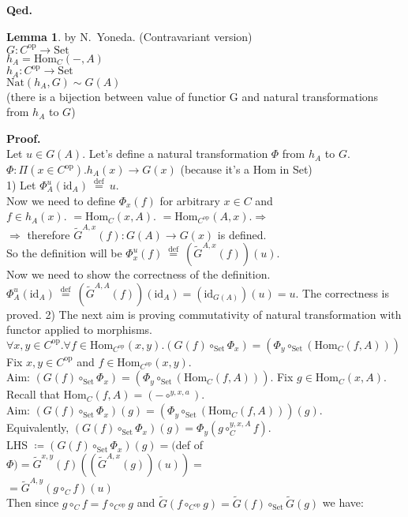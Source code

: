 \documentclass[10pt,a4paper]{article}
\theoremstyle{definition}
\newtheorem{lemma}{Lemma}[section]
\newcommand{\Hom}{{\textrm{Hom}}}
\newcommand{\Nat}{{\textrm{Nat}}}
\newcommand{\GMor}{{\widetilde{G}\textrm{}}}
\newcommand{\op}{{\textrm{op}}}
\newcommand{\id}{{\textrm{id}}}
\newcommand{\defi}{{\textrm{def}}}
\newcommand{\eqdef}{{\ \stackrel{\defi}{=}\ }}
\newcommand{\Set}{{\textrm{Set}}}
\newcommand{\myprf}{\noindent\textbf{Proof.}}
\newcommand{\myqed}{\noindent\textbf{Qed.}}
\begin{document}
\myqed
\begin{lemma}{by N.~Yoneda. (Contravariant version)}\\
$G : C^\op \to \Set$\\
$h_A = \Hom_C(-,A)$\\
$h_A : C^\op \to \Set$\\
$\Nat(h_A,G)\sim G(A)$\\
(there is a bijection between value of functior G and natural transformations from $h_A$ to $G$)
\end{lemma}
\myprf\\
Let $u\in G(A)$. Let's define a natural transformation $\Phi$ from $h_A$ to $G$.\\
$\Phi:\Pi(x\in C^\op).h_A(x)\to G(x)$ (because it's a Hom in Set)\\
1) Let $\Phi^u_A(\id_A)\eqdef u$. \\
Now we need to define $\Phi_x(f)$ for arbitrary $x\in C$ and\\
$f\in h_A(x).$ $=\Hom_C(x,A).$ $=\Hom_{C^\op}(A,x). \Longrightarrow$\\
$\Longrightarrow$ therefore $\GMor ^{A,x}(f):G(A)\to G(x)$ is defined.\\
So the definition will be $\Phi^u_x(f)\eqdef (\GMor^{A,x}(f))(u)$.\\
Now we need to show the correctness of the definition.\\
$\Phi^u_A(\id_A)\eqdef (\GMor^{A,A}(f))(\id_A) = (\id_{G(A)})(u) = u$. The correctness is proved.
2) The next aim is proving commutativity of natural transformation with functor applied to morphisms.\\
$\forall x,y\in C^\op.\forall f\in \Hom_{C^\op}(x,y).(G(f)\circ_\Set \Phi_x) = (\Phi_y \circ_\Set (\Hom_C(f,A)))$
Fix  $x,y\in C^\op$ and $f\in \Hom_{C^\op}(x,y)$.\\
Aim: $(G(f)\circ_\Set \Phi_x) = (\Phi_y \circ_\Set (\Hom_C(f,A)))$.
Fix $g\in \Hom_C(x,A)$. Recall that $\Hom_C(f,A)=(-\circ^{y,x,a})$.\\
Aim: $(G(f)\circ_\Set \Phi_x)(g) = (\Phi_y \circ_\Set (\Hom_C(f,A)))(g)$.\\
Equivalently, $(G(f)\circ_\Set \Phi_x)(g) = \Phi_y (g\circ_C^{y,x,A} f)$.\\
LHS $\coloneqq (G(f)\circ_\Set \Phi_x)(g) =($def of $\Phi)= \GMor^{x,y}(f)\left(\left(\GMor^{A,x}\left(g\right)\right)\left(u\right)\right) =$\\
$ =\GMor^{A,y}\left(g\circ_C f\right)(u)$\\
Then since $g\circ_C f = f\circ_{C^\op} g$ and $\GMor(f\circ_{C^\op} g)=  \GMor(f)\circ_\Set \GMor(g)$ we have:\\
\end{document}

